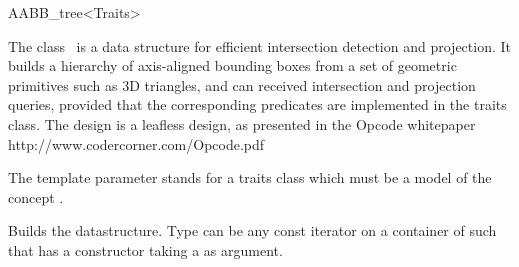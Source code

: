 \ccRefPageBegin


\begin{ccRefClass}{AABB_tree<Traits>}  %


\ccDefinition
  
The class \ccRefName\ is a data structure for efficient intersection detection and projection. It builds a hierarchy of  axis-aligned bounding boxes from a set of geometric primitives such as 3D triangles, and can received intersection and projection queries, provided that the corresponding predicates are implemented in the traits class. The design is a leafless design, as presented in the Opcode whitepaper http://www.codercorner.com/Opcode.pdf

The template parameter  stands for a traits class which must be a model of the concept .




\ccTypes


\ccGlue
{}
\ccGlue
{}

\ccCreation
{}  %

{Builds the datastructure. Type  can be any const iterator on a container of  such that  has a constructor taking a  as argument.}



\end{ccRefClass}

